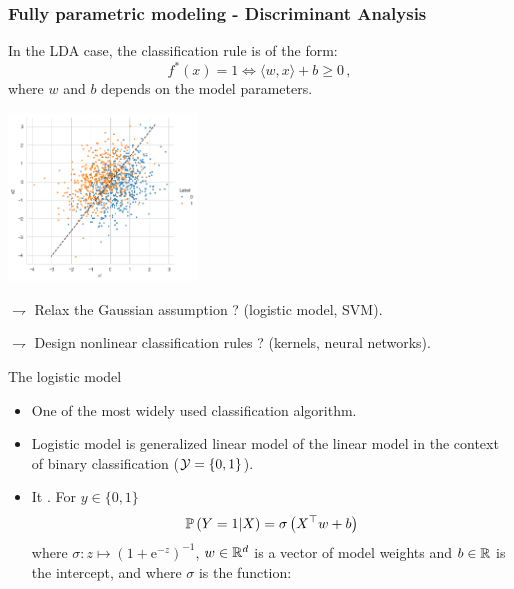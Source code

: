 \documentclass[xcolor={usenames,dvipsnames}]{beamer}
\begin{document}
\begin{frame}\frametitle{Fully parametric modeling - Discriminant Analysis}


In the LDA case, the classification rule is of the form:
\begin{equation*}
f^*(x) = 1 \Leftrightarrow \langle w,x \rangle + b \geqslant 0\,,
\end{equation*}
where \alert{$w$ and $b$ depends on the model parameters}.

\begin{center}
\includegraphics[width=5cm]{./logistic.png} 
\end{center}

$\rightharpoondown$ Relax the Gaussian assumption ? (\alert{logistic model, SVM}).

$\rightharpoondown$ Design  nonlinear classification rules ? (\alert{kernels, neural networks}).

\end{frame}

\begin{frame}{The logistic model}

\begin{itemize}
\item One of the most widely used classification algorithm.

\vspace{.2cm}

\item Logistic model is \alert{generalized linear model} of the linear model in the context of binary classification 
($\Yc = \{0, 1\}$).

\vspace{.2cm}

\item It .
For $y\in \{0, 1\}$
$$
\P\left(  Y = 1 | X \right) = \sigma \left( X^\top w +b \right)
$$
where $\sigma: z\mapsto (1+\mathrm{e}^{-z})^{-1}$,  $w\in \R^d$ is a vector of model weights and $b\in\R$ is the
intercept, and where $\sigma$ is the  function:
\end{itemize}
\end{frame}
\end{document}
